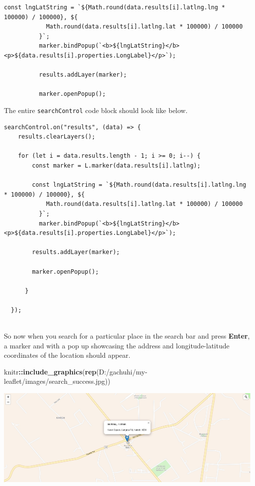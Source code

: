 \documentclass[
]{book}
\newenvironment{Shaded}{\begin{snugshade}}{\end{snugshade}}
\newcommand{\FunctionTok}[1]{\textcolor[rgb]{0.13,0.29,0.53}{\textbf{#1}}}
\newcommand{\NormalTok}[1]{#1}
\newcommand{\SpecialCharTok}[1]{\textcolor[rgb]{0.81,0.36,0.00}{\textbf{#1}}}
\newcommand{\StringTok}[1]{\textcolor[rgb]{0.31,0.60,0.02}{#1}}
\begin{document}
\begin{verbatim}
const lngLatString = `${Math.round(data.results[i].latlng.lng * 100000) / 100000}, ${
            Math.round(data.results[i].latlng.lat * 100000) / 100000
          }`;
          marker.bindPopup(`<b>${lngLatString}</b><p>${data.results[i].properties.LongLabel}</p>`);

          results.addLayer(marker);

          marker.openPopup();
\end{verbatim}

The entire \texttt{searchControl} code block should look like below.

\begin{verbatim}
searchControl.on("results", (data) => {
    results.clearLayers();

    for (let i = data.results.length - 1; i >= 0; i--) {
        const marker = L.marker(data.results[i].latlng);

        const lngLatString = `${Math.round(data.results[i].latlng.lng * 100000) / 100000}, ${
            Math.round(data.results[i].latlng.lat * 100000) / 100000
          }`;
          marker.bindPopup(`<b>${lngLatString}</b><p>${data.results[i].properties.LongLabel}</p>`);

        results.addLayer(marker);

        marker.openPopup();

      }

  });
  
\end{verbatim}

So now when you search for a particular place in the search bar and press \textbf{Enter}, a marker and with a pop up showcasing the address and longitude-latitude coordinates of the location should appear.

\begin{Shaded}
\begin{Highlighting}[]
\NormalTok{knitr}\SpecialCharTok{::}\FunctionTok{include\_graphics}\NormalTok{(}\FunctionTok{rep}\NormalTok{(}\StringTok{\textquotesingle{}D:/gachuhi/my{-}leaflet/images/search\_success.jpg\textquotesingle{}}\NormalTok{))}
\end{Highlighting}
\end{Shaded}

\includegraphics{../images/search_success.jpg}
\end{document}
